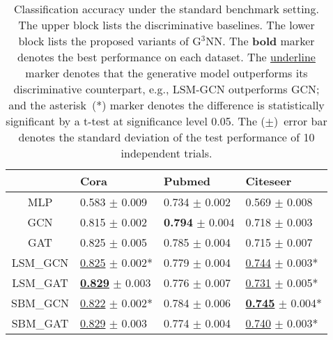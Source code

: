\documentclass{article}
\begin{document}
\begin{table}[tb]
\centering
\caption{Classification accuracy under the standard benchmark setting. The upper block lists the discriminative baselines. The lower block lists the proposed variants of G$^3$NN. The \textbf{bold} marker denotes the best performance on each dataset. The \underline{underline} marker denotes that the generative model outperforms its discriminative counterpart, e.g., LSM-GCN outperforms GCN; and the asterisk~(*) marker denotes the difference is statistically significant by a t-test at significance level 0.05. The ($\pm$)~error bar denotes the standard deviation of the test performance of 10 independent trials.}
\label{tbl:standard}
\begin{tabular}{clll}
\toprule
{} &                                            Cora &                              Pubmed &                                        Citeseer \\
\midrule
MLP     &                       0.583 $\pm$ \small{0.009} &           0.734 $\pm$ \small{0.002} &                       0.569 $\pm$ \small{0.008} \\
GCN     &                       0.815 $\pm$ \small{0.002} &  \textbf{0.794} $\pm$ \small{0.004} &                       0.718 $\pm$ \small{0.003} \\
GAT     &                       0.825 $\pm$ \small{0.005} &           0.785 $\pm$ \small{0.004} &                       0.715 $\pm$ \small{0.007} \\
\hline
LSM\_GCN &           \underline{0.825} $\pm$ \small{0.002}* &           0.779 $\pm$ \small{0.004} &           \underline{0.744} $\pm$ \small{0.003}* \\
LSM\_GAT &  \underline{\textbf{0.829}} $\pm$ \small{0.003} &           0.776 $\pm$ \small{0.007} &           \underline{0.731} $\pm$ \small{0.005}* \\
SBM\_GCN &           \underline{0.822} $\pm$ \small{0.002}* &           0.784 $\pm$ \small{0.006} &  \underline{\textbf{0.745}} $\pm$ \small{0.004}* \\
SBM\_GAT &           \underline{0.829} $\pm$ \small{0.003} &           0.774 $\pm$ \small{0.004} &           \underline{0.740} $\pm$ \small{0.003}* \\
\bottomrule
\end{tabular}

\end{table}
\end{document}
